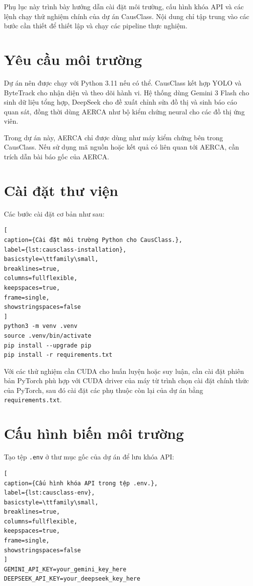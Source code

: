 
Phụ lục này trình bày hướng dẫn cài đặt môi trường, cấu hình khóa API và các lệnh chạy thử nghiệm chính của dự án CausClass. Nội dung chỉ tập trung vào các bước cần thiết để thiết lập và chạy các pipeline thực nghiệm.

\section{Yêu cầu môi trường}

Dự án nên được chạy với Python 3.11 nếu có thể. CausClass kết hợp YOLO và ByteTrack cho nhận diện và theo dõi hành vi. Hệ thống dùng Gemini 3 Flash cho sinh dữ liệu tổng hợp, DeepSeek cho đề xuất chỉnh sửa đồ thị và sinh báo cáo quan sát, đồng thời dùng AERCA như bộ kiểm chứng neural cho các đồ thị ứng viên.

Trong dự án này, AERCA chỉ được dùng như máy kiểm chứng bên trong CausClass. Nếu sử dụng mã nguồn hoặc kết quả có liên quan tới AERCA, cần trích dẫn bài báo gốc của AERCA.

\section{Cài đặt thư viện}

Các bước cài đặt cơ bản như sau:

\begin{lstlisting}[
caption={Cài đặt môi trường Python cho CausClass.},
label={lst:causclass-installation},
basicstyle=\ttfamily\small,
breaklines=true,
columns=fullflexible,
keepspaces=true,
frame=single,
showstringspaces=false
]
python3 -m venv .venv
source .venv/bin/activate
pip install --upgrade pip
pip install -r requirements.txt
\end{lstlisting}

Với các thử nghiệm cần CUDA cho huấn luyện hoặc suy luận, cần cài đặt phiên bản PyTorch phù hợp với CUDA driver của máy từ trình chọn cài đặt chính thức của PyTorch, sau đó cài đặt các phụ thuộc còn lại của dự án bằng \texttt{requirements.txt}.

\section{Cấu hình biến môi trường}

Tạo tệp \texttt{.env} ở thư mục gốc của dự án để lưu khóa API:

\begin{lstlisting}[
caption={Cấu hình khóa API trong tệp .env.},
label={lst:causclass-env},
basicstyle=\ttfamily\small,
breaklines=true,
columns=fullflexible,
keepspaces=true,
frame=single,
showstringspaces=false
]
GEMINI_API_KEY=your_gemini_key_here
DEEPSEEK_API_KEY=your_deepseek_key_here
\end{lstlisting}

